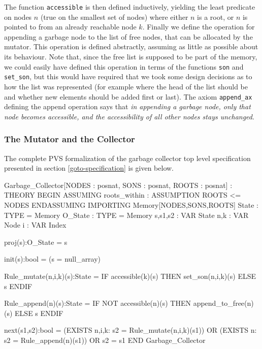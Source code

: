 The function {\tt accessible}  is then defined inductively,
yielding the least predicate on nodes $n$ (true on the smallest set of
nodes) where either  $n$ is  a root, or    $n$ is pointed to from   an
already  reachable node $k$.    Finally  we define  the  operation for
appending a garbage   node to the list    of free nodes,  that  can be
allocated by the    mutator.  This operation is   defined  abstractly,
assuming as little as possible  about its behaviour. Note that,  since
the  free list is supposed to  be part of the  memory, we could easily
have  defined this operation  in terms of the  functions {\tt son} and
{\tt set\_son}, but this would have  required that we took some design
decisions as to how  the list was  represented (for example where  the
head of the  list should be and whether  new elements  should be added
first  or last)\@.   The axiom {\tt   append\_ax} defining the  append
operation says  that {\em in appending a  garbage node, only that node
  becomes accessible,  and the accessibility of  all other nodes stays
  unchanged}\@.

\subsubsection{The Mutator and the Collector}

The  complete PVS formalization  of  the  garbage collector top  level
specification  presented in section  \ref{goto-specification} is given
below.

\begin{smallsession}
Garbage_Collector[NODES : posnat, SONS : posnat, ROOTS : posnat] : THEORY
BEGIN
  ASSUMING roots_within : ASSUMPTION ROOTS <= NODES ENDASSUMING
  IMPORTING Memory[NODES,SONS,ROOTS]
  State   : TYPE = Memory
  O_State : TYPE = Memory
  s,s1,s2 : VAR State
  n,k     : VAR Node
  i       : VAR Index

  proj(s):O_State = s

  init(s):bool = (s = null_array)

  Rule_mutate(n,i,k)(s):State =
    IF accessible(k)(s) THEN 
      set_son(n,i,k)(s)
    ELSE s ENDIF

  Rule_append(n)(s):State =
    IF NOT accessible(n)(s) THEN
      append_to_free(n)(s)
    ELSE s ENDIF

  next(s1,s2):bool =
    (EXISTS n,i,k: s2 = Rule_mutate(n,i,k)(s1)) OR
    (EXISTS n: s2 = Rule_append(n)(s1)) OR
    s2 = s1
END Garbage_Collector
\end{smallsession}
\label{pvs-specification}

